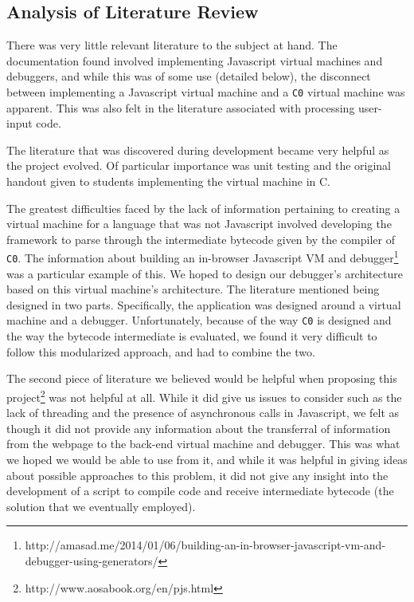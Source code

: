 \documentclass[11pt]{article}
\begin{document}
\subsection{Analysis of Literature Review}
There was very little relevant literature to the subject at hand. The
documentation found involved implementing Javascript virtual machines and
debuggers, and while this was of some use (detailed below), the disconnect
between implementing a Javascript virtual machine and a {\tt C0} virtual
machine was apparent. This was also felt in the literature associated with
processing user-input code.
\par
The literature that was discovered during development became very helpful as
the project evolved. Of particular importance was unit testing and the original
handout given to students implementing the virtual machine in C.
\par
The greatest difficulties faced by the lack of information pertaining to
creating a virtual machine for a language that was not Javascript involved
developing the framework to parse through the intermediate bytecode given
by the compiler of {\tt C0}. The information about building an in-browser
Javascript VM and debugger\footnote{http://amasad.me/2014/01/06/building-an-in-browser-javascript-vm-and-debugger-using-generators/}
was a particular example of this. We hoped to design our debugger's architecture
based on this virtual machine's architecture. The literature mentioned being
designed in two parts. Specifically, the application was designed around a
virtual machine and a debugger. Unfortunately, because of the way {\tt C0} is
designed and the way the bytecode intermediate is evaluated, we found it very
difficult to follow this modularized approach, and had to combine the two.
\par
The second piece of literature we believed would be helpful when proposing this
project\footnote{http://www.aosabook.org/en/pjs.html} was not helpful at all.
While it did give us issues to consider such as the lack of threading and the
presence of asynchronous calls in Javascript, we felt as though it did not
provide any information about the transferral of information from the webpage
to the back-end virtual machine and debugger. This was what we hoped we would
be able to use from it, and while it was helpful in giving ideas about possible
approaches to this problem, it did not give any insight into the development of
a script to compile code and receive intermediate bytecode (the solution that
we eventually employed).
\par
\end{document}
